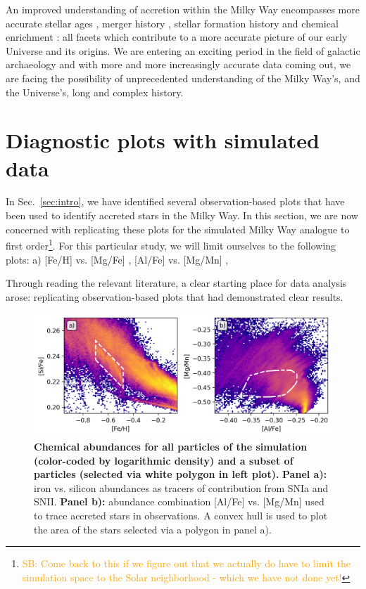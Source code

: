 \documentclass[fleqn,usenatbib]{mnras}
\newcommand{\SB}[1]{{\textcolor{orange}{SB: #1}}}
\begin{document}
An improved understanding of accretion within the Milky Way encompasses more accurate stellar ages \citep{Das2020}, merger history \citep{Naidu2020}, stellar formation history and chemical enrichment \citep{DeSilva2015}: all facets which contribute to a more accurate picture of our early Universe and its origins. We are entering an exciting period in the field of galactic archaeology and with more and more increasingly accurate data coming out, we are facing the possibility of unprecedented understanding of the Milky Way’s, and the Universe’s, long and complex history.


\section{Diagnostic plots with simulated data}
\label{sec:comparison}

In Sec.~\ref{sec:intro}, we have identified several observation-based plots that have been used to identify accreted stars in the Milky Way. In this section, we are now concerned with replicating these plots for the simulated Milky Way analogue to first order\footnote{\SB{Come back to this if we figure out that we actually do have to limit the simulation space to the Solar neighborhood - which we have not done yet!}}. For this particular study, we will limit ourselves to the following plots: a) [Fe/H] vs. [Mg/Fe] \citep{Nissen2010}, [Al/Fe] vs. [Mg/Mn] \citep{Hawkins2015, Das2020}, 


Through reading the relevant literature, a clear starting place for data analysis arose: replicating observation-based plots that had demonstrated clear results.  

\begin{figure}
	\includegraphics[width=\textwidth]{figures/low_alpha_halo.png}
    \caption{
    \textbf{Chemical abundances for all particles of the simulation (color-coded by logarithmic density) and a subset of particles (selected via white polygon in left plot).} 
    \textbf{Panel a):} iron vs. silicon abundances as tracers of contribution from SNIa and SNII. \textbf{Panel b):} abundance combination [Al/Fe] vs. [Mg/Mn] used to trace accreted stars in observations. A convex hull is used to plot the area of the stars selected via a polygon in panel a).
}
    \label{fig:low_alpha_halo}
\end{figure}
\end{document}
